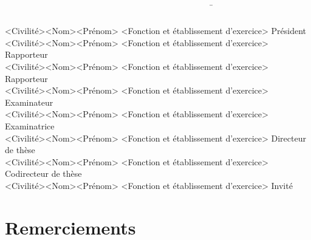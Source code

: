\documentclass[a4paper,french,12pt,twoside,openright]{book}
\begin{document}
\begin{titlepage}
\begin{center}
\begin{flushleft}
\begin{tabbing} %
~~~~~~~~~~~~~~~~~~~~~~~~~~~~~~~~~~~~~~~~~~~~~~~~~\=~~~~~~~~~~~~~~~~~~~~~~~~~~~~~~~~~~~~~~~~~~~~~~~~~~~~~~~~~~~~~~~~~~~~~\=\\ %
<Civilité><Nom><Prénom> \> <Fonction et établissement d’exercice> \> Président\\
<Civilité><Nom><Prénom> \> <Fonction et établissement d’exercice> \> Rapporteur\\
<Civilité><Nom><Prénom> \> <Fonction et établissement d’exercice> \> Rapporteur\\
<Civilité><Nom><Prénom> \> <Fonction et établissement d’exercice> \> Examinateur\\
<Civilité><Nom><Prénom> \> <Fonction et établissement d’exercice> \> Examinatrice\\
<Civilité><Nom><Prénom> \> <Fonction et établissement d’exercice> \> Directeur de thèse\\
<Civilité><Nom><Prénom> \> <Fonction et établissement d’exercice> \> Codirecteur de thèse\\
<Civilité><Nom><Prénom> \> <Fonction et établissement d’exercice> \> Invité
\end{tabbing}
\end{flushleft}
\end{center}
\end{titlepage} %

\chapter*{Remerciements}
\lipsum[1]
\newpage

\tableofcontents
\newpage
\listoffigures
\newpage
\listoftables
\newpage
\end{document}
